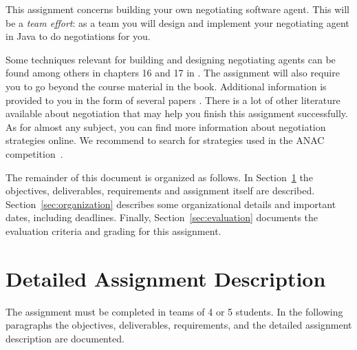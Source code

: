 \documentclass[a4paper]{article}
\begin{document}
This assignment 
concerns building your own negotiating software agent. This will be a {\em team effort}: as a team you will
design and implement your negotiating agent in Java to do negotiations for you.

Some techniques relevant for building and designing negotiating agents can be found among others in chapters 16 and 17 in \cite{Rus033rd}. The assignment will also require you to go beyond the course material in the book. Additional information is provided to you in the form of several papers \cite{Baarslag12ACAN,Jon01,Lin12,Far98,Ser05}. There is a lot of other literature available about negotiation that may help you finish this assignment successfully. As for almost any subject, you can find more information about negotiation strategies online. We recommend to search for strategies used in the ANAC competition~\cite{ANAC2011Baa,ANAC2011Ada,ANAC2011Dir,ANAC2011Fis,ANAC2011Frie,ANAC2011Kaw,ANAC2011Kri,ANAC2011Wil}.

The remainder of this document is organized as follows. In Section~\ref{sec:assignment} the objectives, deliverables, requirements and assignment itself are described. Section~\ref{sec:organization} describes some organizational details and important dates, including deadlines. Finally, Section~\ref{sec:evaluation} documents the evaluation criteria and grading for this assignment.

\section{Detailed Assignment Description}\label{sec:assignment}
The assignment must be completed in teams of 4 or 5 students. In the following paragraphs the objectives, deliverables, requirements, and the detailed assignment description are documented.
\end{document}
